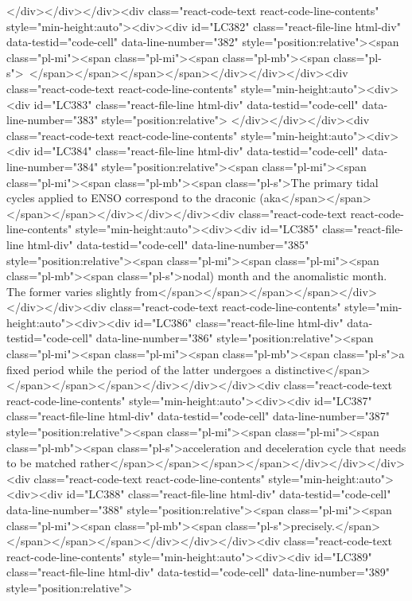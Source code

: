 {{{{{</div></div></div><div class="react-code-text react-code-line-contents" style="min-height:auto"><div><div id="LC382" class="react-file-line html-div" data-testid="code-cell" data-line-number="382" style="position:relative"><span class="pl-mi"><span class="pl-mi"><span class="pl-mb"><span class="pl-s">~</span></span></span></span></div></div></div><div class="react-code-text react-code-line-contents" style="min-height:auto"><div><div id="LC383" class="react-file-line html-div" data-testid="code-cell" data-line-number="383" style="position:relative">
</div></div></div><div class="react-code-text react-code-line-contents" style="min-height:auto"><div><div id="LC384" class="react-file-line html-div" data-testid="code-cell" data-line-number="384" style="position:relative"><span class="pl-mi"><span class="pl-mi"><span class="pl-mb"><span class="pl-s">The primary tidal cycles applied to ENSO correspond to the draconic (aka</span></span></span></span></div></div></div><div class="react-code-text react-code-line-contents" style="min-height:auto"><div><div id="LC385" class="react-file-line html-div" data-testid="code-cell" data-line-number="385" style="position:relative"><span class="pl-mi"><span class="pl-mi"><span class="pl-mb"><span class="pl-s">nodal) month and the anomalistic month. The former varies slightly from</span></span></span></span></div></div></div><div class="react-code-text react-code-line-contents" style="min-height:auto"><div><div id="LC386" class="react-file-line html-div" data-testid="code-cell" data-line-number="386" style="position:relative"><span class="pl-mi"><span class="pl-mi"><span class="pl-mb"><span class="pl-s">a fixed period while the period of the latter undergoes a distinctive</span></span></span></span></div></div></div><div class="react-code-text react-code-line-contents" style="min-height:auto"><div><div id="LC387" class="react-file-line html-div" data-testid="code-cell" data-line-number="387" style="position:relative"><span class="pl-mi"><span class="pl-mi"><span class="pl-mb"><span class="pl-s">acceleration and deceleration cycle that needs to be matched rather</span></span></span></span></div></div></div><div class="react-code-text react-code-line-contents" style="min-height:auto"><div><div id="LC388" class="react-file-line html-div" data-testid="code-cell" data-line-number="388" style="position:relative"><span class="pl-mi"><span class="pl-mi"><span class="pl-mb"><span class="pl-s">precisely.</span></span></span></span></div></div></div><div class="react-code-text react-code-line-contents" style="min-height:auto"><div><div id="LC389" class="react-file-line html-div" data-testid="code-cell" data-line-number="389" style="position:relative">
}}}}}
